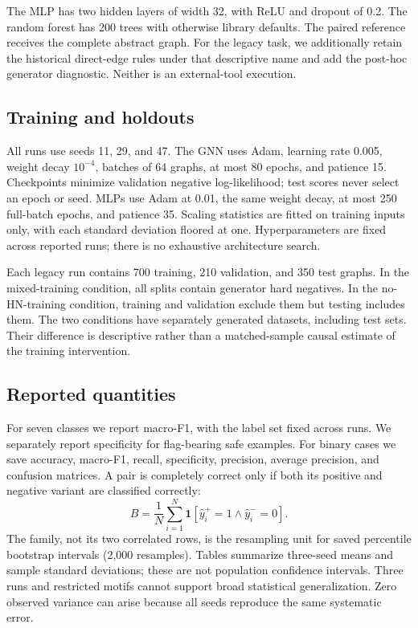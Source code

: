 \documentclass[journal]{IEEEtran}
\begin{document}
The MLP has two hidden layers of width 32, with ReLU and dropout of 0.2. The random forest has 200 trees with otherwise library defaults. The paired reference receives the complete abstract graph. For the legacy task, we additionally retain the historical direct-edge rules under that descriptive name and add the post-hoc generator diagnostic. Neither is an external-tool execution.

\subsection{Training and holdouts}
All runs use seeds 11, 29, and 47. The GNN uses Adam, learning rate 0.005, weight decay $10^{-4}$, batches of 64 graphs, at most 80 epochs, and patience 15. Checkpoints minimize validation negative log-likelihood; test scores never select an epoch or seed. MLPs use Adam at 0.01, the same weight decay, at most 250 full-batch epochs, and patience 35. Scaling statistics are fitted on training inputs only, with each standard deviation floored at one. Hyperparameters are fixed across reported runs; there is no exhaustive architecture search.

Each legacy run contains 700 training, 210 validation, and 350 test graphs. In the mixed-training condition, all splits contain generator hard negatives. In the no-HN-training condition, training and validation exclude them but testing includes them. The two conditions have separately generated datasets, including test sets. Their difference is descriptive rather than a matched-sample causal estimate of the training intervention.

\subsection{Reported quantities}
For seven classes we report macro-F1, with the label set fixed across runs. We separately report specificity for flag-bearing safe examples. For binary cases we save accuracy, macro-F1, recall, specificity, precision, average precision, and confusion matrices. A pair is completely correct only if both its positive and negative variant are classified correctly:
\begin{equation}
 B=\frac{1}{N}\sum_{i=1}^{N}
 \mathbf{1}[\hat y_i^+=1\land\hat y_i^-=0].
\end{equation}
The family, not its two correlated rows, is the resampling unit for saved percentile bootstrap intervals (2,000 resamples). Tables summarize three-seed means and sample standard deviations; these are not population confidence intervals. Three runs and restricted motifs cannot support broad statistical generalization. Zero observed variance can arise because all seeds reproduce the same systematic error.
\end{document}

